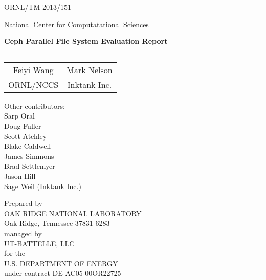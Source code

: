 \thispagestyle{empty}

\hfill ORNL/TM-2013/151


\vspace{3em}

\begin{center}
National Center for Computatational Sciences
\end{center}


\vspace{3em}

\begin{center}
\textbf{\Large Ceph Parallel File System Evaluation Report}\\
\rule{5in}{1pt}%
\end{center}

\vspace{0.5in}

\begin{center}
\begin{tabular}{ c c }
Feiyi Wang  &  Mark Nelson \\ 
ORNL/NCCS & Inktank Inc. \\
\end{tabular}
\end{center}

\vspace{0.25in}

\begin{center}
Other contributors: \\
\vspace{1em}
Sarp Oral\\
Doug Fuller\\
Scott Atchley\\
Blake Caldwell\\
James Simmons\\
Brad Settlemyer\\
Jason Hill\\
Sage Weil (Inktank Inc.)
\end{center}


\vfill

\begin{center}
Prepared by \\
OAK RIDGE NATIONAL LABORATORY\\
Oak Ridge, Tennessee 37831-6283 \\ 
managed by \\
UT-BATTELLE, LLC \\
for the \\
U.S. DEPARTMENT OF ENERGY\\ 
under contract DE-AC05-00OR22725
\end{center}

\pagebreak
